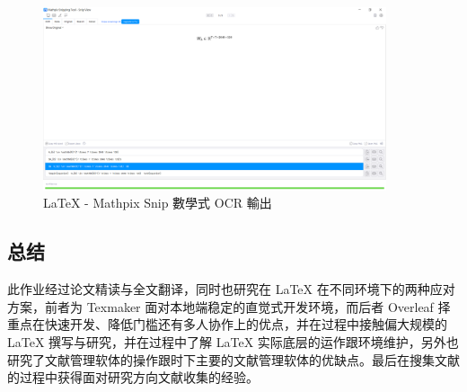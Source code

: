 \begin{figure}[htb]
\centering 
\includegraphics[width=0.90\textwidth]{img/c3m4.png} 
\caption{LaTeX - Mathpix Snip 數學式 OCR 輸出}
\label{Test}
\end{figure}

\subsection{总结}

此作业经过论文精读与全文翻译，同时也研究在 LaTeX 在不同环境下的两种应对方案，前者为 Texmaker 面对本地端稳定的直觉式开发环境，而后者 Overleaf 择重点在快速开发、降低门槛还有多人协作上的优点，并在过程中接触偏大规模的 LaTeX 撰写与研究，并在过程中了解 LaTeX 实际底层的运作跟环境维护，另外也研究了文献管理软体的操作跟时下主要的文献管理软体的优缺点。最后在搜集文献的过程中获得面对研究方向文献收集的经验。